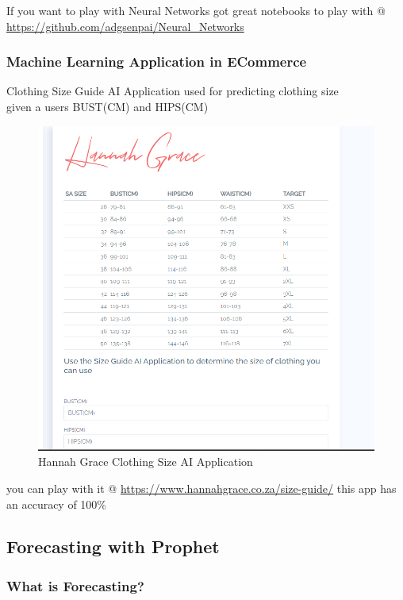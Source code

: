 If you want to play with Neural Networks got great notebooks to play with @ 
\url{https://github.com/adgsenpai/Neural_Networks}

\subsubsection{Machine Learning Application in ECommerce}

Clothing Size Guide AI Application used for predicting clothing size \\
given a users BUST(CM) and HIPS(CM) \\ 

\begin{figure}[H]
    \includegraphics[width=\linewidth]{images/hannahgrace.png}
    \caption{Hannah Grace Clothing Size AI Application}
    \label{fig:clothingai}
\end{figure}

you can play with it @ \url{https://www.hannahgrace.co.za/size-guide/} this app has an accuracy of 100\%

\subsection{Forecasting with Prophet}
\subsubsection{What is Forecasting?}

